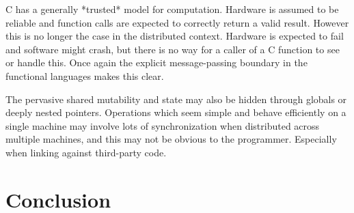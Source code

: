 \documentclass[10pt,a4paper,twocolumn]{article}
\begin{document}
C has a generally *trusted* model for computation. Hardware is assumed to be
reliable and function calls are expected to correctly return a valid result.
However this is no longer the case in the distributed context. Hardware is
expected to fail and software might crash, but there is no way for a caller of a
C function to see or handle this. Once again the explicit message-passing
boundary in the functional languages makes this clear.

The pervasive shared mutability and state may also be hidden through globals or
deeply nested pointers. Operations which seem simple and behave efficiently on a
single machine may involve lots of synchronization when distributed across
multiple machines, and this may not be obvious to the programmer. Especially
when linking against third-party code.


\section{Conclusion}

\small



\end{document}

